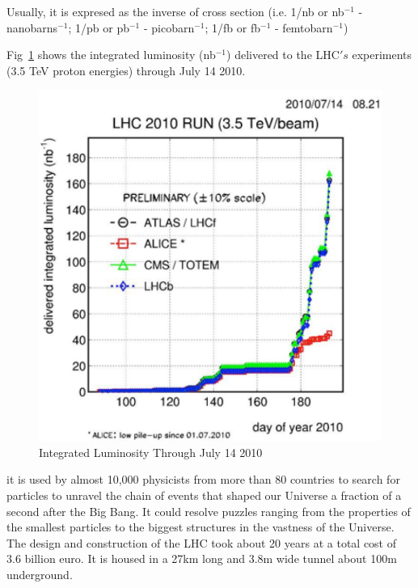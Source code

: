 \;
\;

\noindent
Usually, it is expresed as the inverse of cross section (i.e. 1/nb or nb$^{-1}$ - nanobarns$^{-1}$; 1/pb or pb$^{-1}$ - picobarn$^{-1}$; 1/fb or fb$^{-1}$ - femtobarn$^{-1}$)

\;
\;

\noindent Fig~\ref{fig:accel4} shows the integrated luminosity (nb$^{-1}$) delivered to the LHC$'s$ experiments (3.5 TeV proton energies) through July 14 2010.

\;
\;

\begin{figure}[h]
\centering\includegraphics[scale=0.7]{./Particleaccelerators/Pictures/fig4.pdf}
\caption{Integrated Luminosity Through July 14 2010}
\label{fig:accel4}
\end{figure}

\;
\;

\noindent
it is used by almost 10,000 physicists from more than 80 countries to search for particles to unravel the chain of events that shaped our Universe a fraction of a second after the Big Bang. It could resolve puzzles ranging from the properties of the smallest particles to the biggest structures in the vastness of the Universe. The design and construction of the LHC took about 20 years at a total cost of  3.6 billion euro. It is housed in a 27km long and 3.8m wide tunnel about 100m underground.

